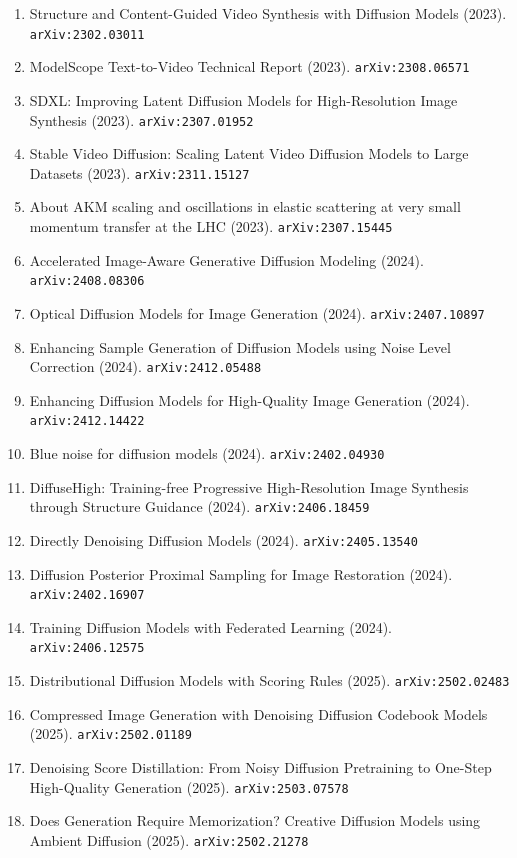 \documentclass[11pt]{article}
\begin{document}
\begin{enumerate}
  \item Structure and Content-Guided Video Synthesis with Diffusion Models (2023). \texttt{arXiv:2302.03011}
  \item ModelScope Text-to-Video Technical Report (2023). \texttt{arXiv:2308.06571}
  \item SDXL: Improving Latent Diffusion Models for High-Resolution Image
  Synthesis (2023). \texttt{arXiv:2307.01952}
  \item Stable Video Diffusion: Scaling Latent Video Diffusion Models to Large
  Datasets (2023). \texttt{arXiv:2311.15127}
  \item About AKM scaling and oscillations in elastic scattering at very small
  momentum transfer at the LHC (2023). \texttt{arXiv:2307.15445}
  \item Accelerated Image-Aware Generative Diffusion Modeling (2024). \texttt{arXiv:2408.08306}
  \item Optical Diffusion Models for Image Generation (2024). \texttt{arXiv:2407.10897}
  \item Enhancing Sample Generation of Diffusion Models using Noise Level Correction (2024). \texttt{arXiv:2412.05488}
  \item Enhancing Diffusion Models for High-Quality Image Generation (2024). \texttt{arXiv:2412.14422}
  \item Blue noise for diffusion models (2024). \texttt{arXiv:2402.04930}
  \item DiffuseHigh: Training-free Progressive High-Resolution Image Synthesis
  through Structure Guidance (2024). \texttt{arXiv:2406.18459}
  \item Directly Denoising Diffusion Models (2024). \texttt{arXiv:2405.13540}
  \item Diffusion Posterior Proximal Sampling for Image Restoration (2024). \texttt{arXiv:2402.16907}
  \item Training Diffusion Models with Federated Learning (2024). \texttt{arXiv:2406.12575}
  \item Distributional Diffusion Models with Scoring Rules (2025). \texttt{arXiv:2502.02483}
  \item Compressed Image Generation with Denoising Diffusion Codebook Models (2025). \texttt{arXiv:2502.01189}
  \item Denoising Score Distillation: From Noisy Diffusion Pretraining to One-Step High-Quality Generation (2025). \texttt{arXiv:2503.07578}
  \item Does Generation Require Memorization? Creative Diffusion Models using Ambient Diffusion (2025). \texttt{arXiv:2502.21278}

\end{enumerate}
\end{document}
